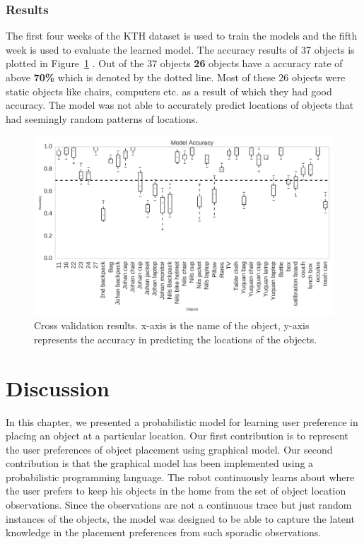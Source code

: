\subsubsection*{Results}

The first four weeks of the KTH dataset is used to train the models and the fifth week is used to evaluate the learned model. The accuracy results of 37 objects is plotted in Figure~\ref{fig:kth_object_evaluation} . 
Out of the 37 objects \textbf{26} objects have a accuracy rate of above \textbf{70\%} which is denoted by the dotted line. Most of these 26 objects were static objects like chairs, computers etc. as a result of which they had good accuracy. The model was not able to accurately predict locations of objects that had seemingly random patterns of locations.
\begin{figure}[htp]
\centering
\includegraphics[width=\textwidth]{images/evaluation_kth.png}
\caption[Cross validation results]{Cross validation results. x-axis is the name of the object, y-axis represents the accuracy in predicting the locations of the objects. }
\label{fig:kth_object_evaluation}
\end{figure}

\FloatBarrier
\section{Discussion}
In this chapter, we presented a probabilistic model for learning user preference in placing an object at a particular location. 
Our first contribution is to represent the user preferences of object placement using graphical model. 
Our second contribution is that the graphical model has been implemented using a probabilistic programming language. 
The robot continuously learns about where the user prefers to keep his objects in the home from the set of object location observations. 
Since the observations are not a continuous trace but just random instances of the objects, the model was designed to be able to capture the latent knowledge in the placement preferences from such sporadic observations.

